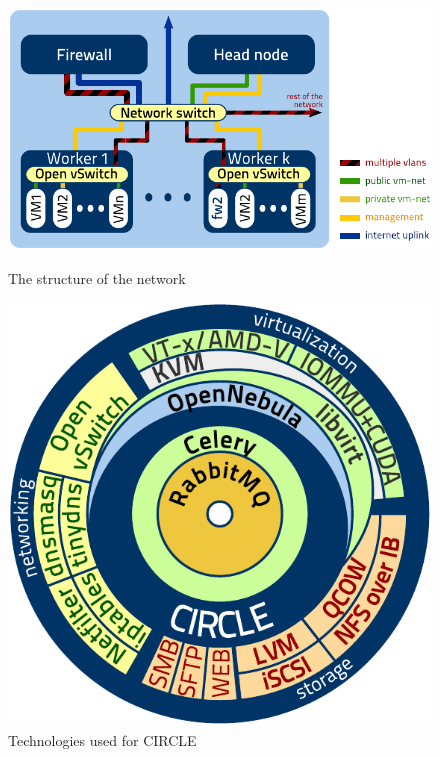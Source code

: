 \documentclass{llncs}
\begin{document}
  \begin{figure}[ht]
    \begin{minipage}[b]{0.5\linewidth}
      \centering
      \includegraphics[width=\textwidth]{netarch}
      \caption{The structure of the network}
      \label{fig:figure1}
    \end{minipage}
    \hspace{0.5cm}
    \begin{minipage}[b]{0.4\linewidth}
      \centering
      \includegraphics[width=\textwidth]{swarch}
      \caption{Technologies used for CIRCLE}
      \label{fig:figure2}
    \end{minipage}
      
  \end{figure}
\end{document}
